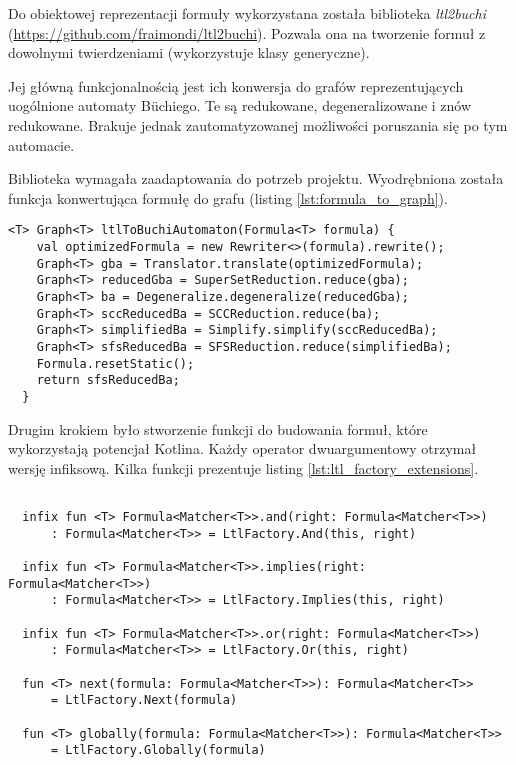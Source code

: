 Do obiektowej reprezentacji formuły wykorzystana została biblioteka \textit{ltl2buchi} \\(\url{https://github.com/fraimondi/ltl2buchi}).
Pozwala ona na tworzenie formuł z dowolnymi twierdzeniami (wykorzystuje klasy generyczne).

Jej główną funkcjonalnością jest ich konwersja do grafów reprezentujących uogólnione automaty Büchiego.
Te są redukowane, degeneralizowane i znów redukowane.
Brakuje jednak zautomatyzowanej możliwości poruszania się po tym automacie.

Biblioteka wymagała zaadaptowania do potrzeb projektu.
Wyodrębniona została funkcja konwertująca formułę do grafu (listing \ref{lst:formula_to_graph}).

\begin{minipage}{\linewidth}
\begin{lstlisting}[caption={Funkcja konwertująca formułę LTL do grafu.},captionpos=b,label={lst:formula_to_graph}]
  <T> Graph<T> ltlToBuchiAutomaton(Formula<T> formula) {
    val optimizedFormula = new Rewriter<>(formula).rewrite();
    Graph<T> gba = Translator.translate(optimizedFormula);
    Graph<T> reducedGba = SuperSetReduction.reduce(gba);
    Graph<T> ba = Degeneralize.degeneralize(reducedGba);
    Graph<T> sccReducedBa = SCCReduction.reduce(ba);
    Graph<T> simplifiedBa = Simplify.simplify(sccReducedBa);
    Graph<T> sfsReducedBa = SFSReduction.reduce(simplifiedBa);
    Formula.resetStatic();
    return sfsReducedBa;
  }

\end{lstlisting}
\end{minipage}

Drugim krokiem było stworzenie funkcji do budowania formuł, które wykorzystają potencjał Kotlina.
Każdy operator dwuargumentowy otrzymał wersję infiksową.
Kilka funkcji prezentuje listing \ref{lst:ltl_factory_extensions}.

\begin{minipage}{\linewidth}
\begin{lstlisting}[caption={Przykładowe funkcje do budowania formuł w języku Kotlin.},captionpos=b,label={lst:ltl_factory_extensions}]

  infix fun <T> Formula<Matcher<T>>.and(right: Formula<Matcher<T>>)
      : Formula<Matcher<T>> = LtlFactory.And(this, right)

  infix fun <T> Formula<Matcher<T>>.implies(right: Formula<Matcher<T>>)
      : Formula<Matcher<T>> = LtlFactory.Implies(this, right)

  infix fun <T> Formula<Matcher<T>>.or(right: Formula<Matcher<T>>)
      : Formula<Matcher<T>> = LtlFactory.Or(this, right)

  fun <T> next(formula: Formula<Matcher<T>>): Formula<Matcher<T>>
      = LtlFactory.Next(formula)

  fun <T> globally(formula: Formula<Matcher<T>>): Formula<Matcher<T>>
      = LtlFactory.Globally(formula)

\end{lstlisting}
\end{minipage}

